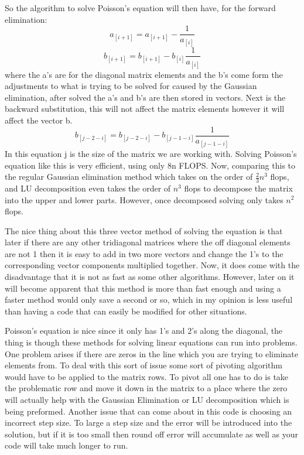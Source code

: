 \documentclass[12pt,righttag]{article}
\begin{document}
	So the algorithm to solve Poisson's equation will then have, for the forward elimination:
	\[a_{[i+1]}=a_{[i+1]}-\frac{1}{a_{[i]}}\]
	\[b_{[i+1]}=b_{[i+1]}-b_{[i]}\frac{1}{a_{[i]}}\]
	where the a's are for the diagonal matrix elements and the b's come form the adjustments to what is trying to be solved for caused by the Gaussian elimination, after solved the a's and b's are then stored in vectors. Next is the backward substitution, this will not affect the matrix elements however it will affect the vector b.
	\[b_{[j-2-i]}=b_{[j-2-i]}-b_{[j-1-i]}\frac{1}{a_{[j-1-i]}}\]
	In this equation j is the size of the matrix we are working with. Solving Poisson's equation like this is very efficient, using only 8n FLOPS. Now, comparing this to the regular Gaussian elimination method which takes on the order of $\frac{2}{3}n^3$ flops, and LU decomposition even takes the order of $n^3$ flops to decompose the matrix into the upper and lower parts. However, once decomposed solving only takes $n^2$ flops.
	
	 The nice thing about this three vector method of solving the equation is that later if there are any other tridiagonal matrices where the off diagonal elements are not 1 then it is easy to add in two more vectors and change the 1's to the corresponding vector components multiplied together. Now, it does come with the disadvantage that it is not as fast as some other algorithms. However, later on it will become apparent that this method is more than fast enough and using a faster method would only save a second or so, which in my opinion is less useful than having a code that can easily be modified for other situations.
	
	Poisson's equation is nice since it only has 1's and 2's along the diagonal, the thing is though these methods for solving linear equations can run into problems. One problem arises if there are zeros in the line which you are trying to eliminate elements from. To deal with this sort of issue some sort of pivoting algorithm would have to be applied to the matrix rows. To pivot all one has to do is take the problematic row and move it down in the matrix to a place where the zero will actually help with the Gaussian Elimination or LU decomposition which is being preformed. Another issue that can come about in this code is choosing an incorrect step size. To large a step size and the error will be introduced into the solution, but if it is too small then round off error will accumulate as well as your code will take much longer to run.
	
\end{document}
